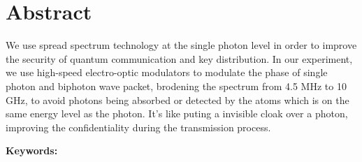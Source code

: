 \documentclass[class=NCU_thesis, crop=false]{standalone}
\begin{document}
\chapter{Abstract}
We use spread spectrum technology at the single photon level in order to improve the security of quantum communication and key distribution. In our experiment, we use high-speed electro-optic modulators to modulate the phase of single photon and biphoton wave packet, brodening the spectrum from 4.5 MHz to 10 GHz, to avoid photons being absorbed or detected by the atoms which is on the same energy level as the photon. It's like puting a invisible cloak over a photon, improving the confidentiality during the transmission process.

\vspace{2em}
\noindent \textbf{Keywords:} \keywordsEn{} %
\end{document}
